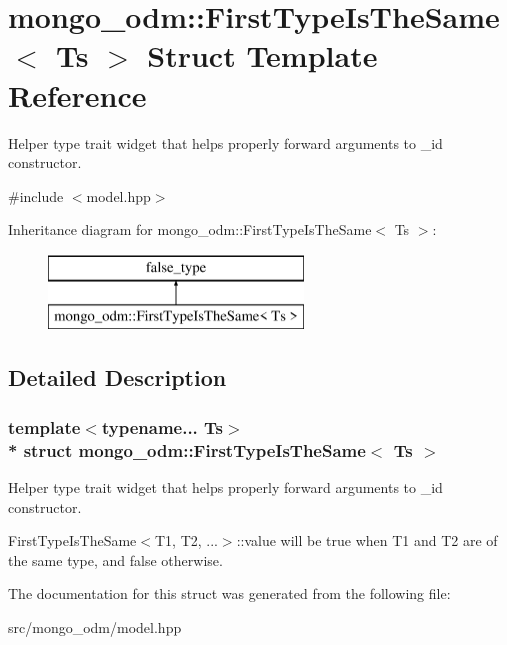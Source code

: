 \hypertarget{structmongo__odm_1_1FirstTypeIsTheSame}{}\section{mongo\+\_\+odm\+:\+:First\+Type\+Is\+The\+Same$<$ Ts $>$ Struct Template Reference}
\label{structmongo__odm_1_1FirstTypeIsTheSame}


Helper type trait widget that helps properly forward arguments to \+\_\+id constructor.  




{\ttfamily \#include $<$model.\+hpp$>$}

Inheritance diagram for mongo\+\_\+odm\+:\+:First\+Type\+Is\+The\+Same$<$ Ts $>$\+:\begin{figure}[H]
\begin{center}
\leavevmode
\includegraphics[height=2.000000cm]{structmongo__odm_1_1FirstTypeIsTheSame}
\end{center}
\end{figure}


\subsection{Detailed Description}
\subsubsection*{template$<$typename... Ts$>$\\*
struct mongo\+\_\+odm\+::\+First\+Type\+Is\+The\+Same$<$ Ts $>$}

Helper type trait widget that helps properly forward arguments to \+\_\+id constructor. 

First\+Type\+Is\+The\+Same$<$\+T1, T2, ...$>$\+::value will be true when T1 and T2 are of the same type, and false otherwise. 

The documentation for this struct was generated from the following file\+:\begin{DoxyCompactItemize}
\item 
src/mongo\+\_\+odm/model.\+hpp\end{DoxyCompactItemize}
